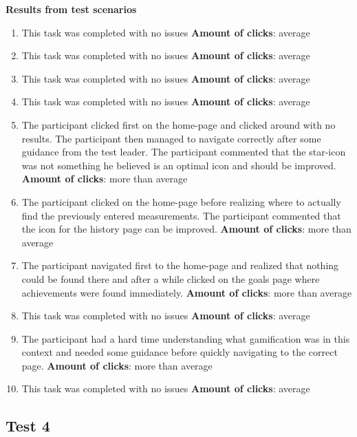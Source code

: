 \noindent\textbf{Results from test scenarios}
\begin{enumerate}
\item This task was completed with no issues
\subitem \textbf{Amount of clicks}: average
\item This task was completed with no issues
\subitem \textbf{Amount of clicks}: average
\item This task was completed with no issues
\subitem \textbf{Amount of clicks}: average
\item This task was completed with no issues
\subitem \textbf{Amount of clicks}: average
\item The participant clicked first on the home-page and clicked around with no results. The participant then managed to navigate correctly after some guidance from the test leader. The participant commented that the star-icon was not something he believed is an optimal icon and should be improved. 
\subitem \textbf{Amount of clicks}: more than average
\item The participant clicked on the home-page before realizing where to actually find the previously entered measurements. The participant commented that the icon for the history page can be improved.
\subitem \textbf{Amount of clicks}: more than average
\item The participant navigated first to the home-page and realized that nothing could be found there and after a while clicked on the goals page where achievements were found immediately. 
\subitem\textbf{Amount of clicks}: more than average
\item This task was completed with no issues 
\subitem \textbf{Amount of clicks}: average
\item The participant had a hard time understanding what gamification was in this context and needed some guidance before quickly navigating to the correct page. 
\subitem \textbf{Amount of clicks}: more than average
\item This task was completed with no issues 
\subitem \textbf{Amount of clicks}: average
\end{enumerate}



\subsection{Test 4}

